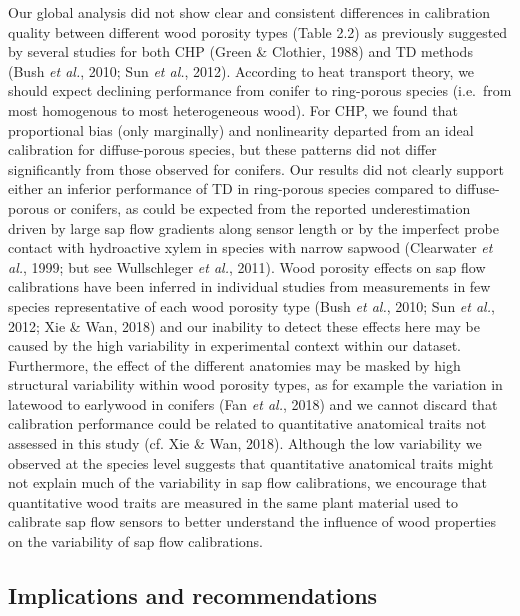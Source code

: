 \documentclass[11pt,twoside]{reedthesis}
\begin{document}
Our global analysis did not show clear and consistent differences in
calibration quality between different wood porosity types (Table 2.2) as
previously suggested by several studies for both CHP (Green \& Clothier,
1988) and TD methods (Bush \emph{et al.}, 2010; Sun \emph{et al.},
2012). According to heat transport theory, we should expect declining
performance from conifer to ring-porous species (i.e.~from most
homogenous to most heterogeneous wood). For CHP, we found that
proportional bias (only marginally) and nonlinearity departed from an
ideal calibration for diffuse-porous species, but these patterns did not
differ significantly from those observed for conifers. Our results did
not clearly support either an inferior performance of TD in ring-porous
species compared to diffuse-porous or conifers, as could be expected
from the reported underestimation driven by large sap flow gradients
along sensor length or by the imperfect probe contact with hydroactive
xylem in species with narrow sapwood (Clearwater \emph{et al.}, 1999;
but see Wullschleger \emph{et al.}, 2011). Wood porosity effects on sap
flow calibrations have been inferred in individual studies from
measurements in few species representative of each wood porosity type
(Bush \emph{et al.}, 2010; Sun \emph{et al.}, 2012; Xie \& Wan, 2018)
and our inability to detect these effects here may be caused by the high
variability in experimental context within our dataset. Furthermore, the
effect of the different anatomies may be masked by high structural
variability within wood porosity types, as for example the variation in
latewood to earlywood in conifers (Fan \emph{et al.}, 2018) and we
cannot discard that calibration performance could be related to
quantitative anatomical traits not assessed in this study (cf. Xie \&
Wan, 2018). Although the low variability we observed at the species
level suggests that quantitative anatomical traits might not explain
much of the variability in sap flow calibrations, we encourage that
quantitative wood traits are measured in the same plant material used to
calibrate sap flow sensors to better understand the influence of wood
properties on the variability of sap flow calibrations.\par

\subsection{Implications and
recommendations}\label{implications-and-recommendations}
\end{document}
